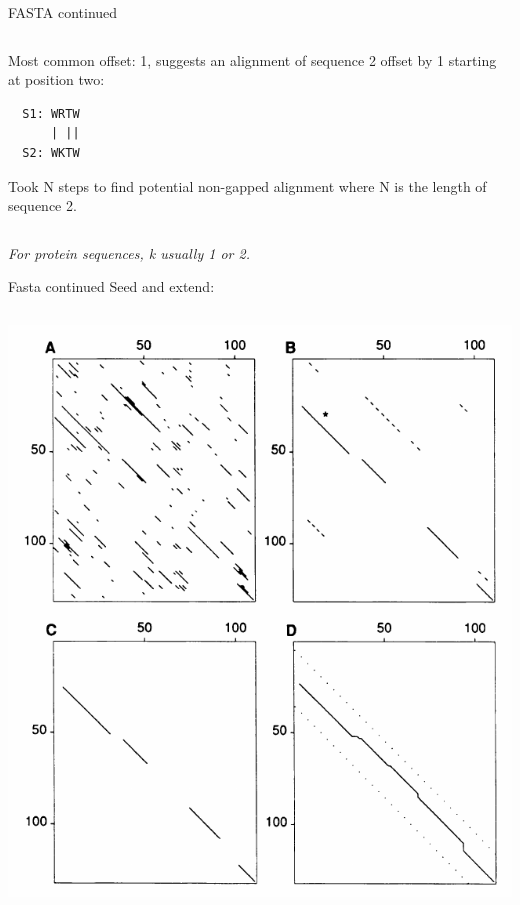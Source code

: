 \documentclass[pdf]{beamer}
\begin{document}
\begin{frame}[fragile]{FASTA continued}
\begin{columns}
\begin{column}[t]{0.5\textwidth}
      \vspace{2ex}
      {\small
      Most common offset: 1, suggests an alignment of sequence 2 offset by 1
      starting at position two:

\begin{verbatim}
  S1: WRTW
      | ||
  S2: WKTW      
\end{verbatim}
      
      Took N steps to find potential non-gapped alignment where N is the
      length of sequence 2.
    }
    \end{column}
  \end{columns}
  {\small
  \emph{For protein sequences, k usually 1 or 2.}
  }
\end{frame}

\begin{frame}{Fasta continued}
  Seed and extend:
  \begin{columns}
    \begin{column}{0.5\textwidth}
      \includegraphics[width=\textwidth]{images/Fasta_four_steps_b}


\end{column}
\end{columns}
\end{frame}
\end{document}
